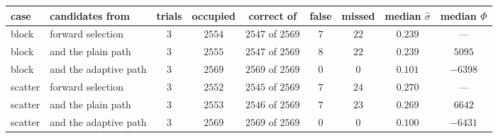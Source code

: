 \begin{center}
\footnotesize
\begin{tabular}{llccccccc}
case & candidates from & trials & occupied & correct of & false & missed & median $\hat\sigma$ & median $\Phi$ \\
\hline
block & forward selection & $3$ & $2554$ & $2547$ of $2569$ & $7$ & $22$ & $0.239$ & --- \\
block & and the plain path & $3$ & $2555$ & $2547$ of $2569$ & $8$ & $22$ & $0.239$ & $5095$ \\
block & and the adaptive path & $3$ & $2569$ & $2569$ of $2569$ & $0$ & $0$ & $0.101$ & $-6398$ \\
\hline
scatter & forward selection & $3$ & $2552$ & $2545$ of $2569$ & $7$ & $24$ & $0.270$ & --- \\
scatter & and the plain path & $3$ & $2553$ & $2546$ of $2569$ & $7$ & $23$ & $0.269$ & $6642$ \\
scatter & and the adaptive path & $3$ & $2569$ & $2569$ of $2569$ & $0$ & $0$ & $0.100$ & $-6431$ \\
\end{tabular}
\end{center}
